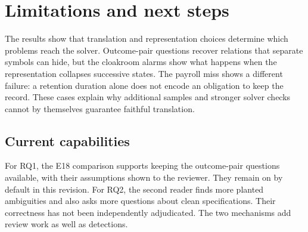 \section{Limitations and next steps}\label{sec:discussion}

The results show that translation and representation choices determine which problems reach the solver. Outcome-pair questions recover relations that separate symbols can hide, but the cloakroom alarms show what happens when the representation collapses successive states. The payroll miss shows a different failure: a retention duration alone does not encode an obligation to keep the record. These cases explain why additional samples and stronger solver checks cannot by themselves guarantee faithful translation.

\subsection{Current capabilities}

For RQ1, the E18 comparison supports keeping the outcome-pair questions available, with their assumptions shown to the reviewer. They remain on by default in this revision. For RQ2, the second reader finds more planted ambiguities and also asks more questions about clean specifications. Their correctness has not been independently adjudicated. The two mechanisms add review work as well as detections.

